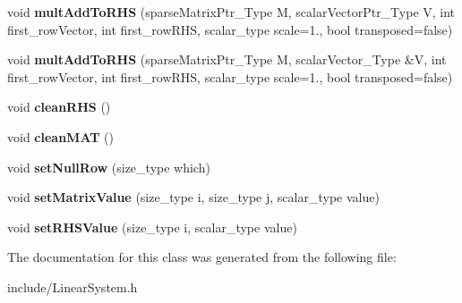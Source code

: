 \begin{DoxyCompactItemize}
\mbox{\label{classLinearSystem_aa2a59e6468778d3c655299065876f769}} 
void {\bfseries mult\+Add\+To\+R\+HS} (sparse\+Matrix\+Ptr\+\_\+\+Type M, scalar\+Vector\+Ptr\+\_\+\+Type V, int first\+\_\+row\+Vector, int first\+\_\+row\+R\+HS, scalar\+\_\+type scale=1., bool transposed=false)
\item 
\mbox{\label{classLinearSystem_a13451139fc04cc34d025fcb5b053ae01}} 
void {\bfseries mult\+Add\+To\+R\+HS} (sparse\+Matrix\+Ptr\+\_\+\+Type M, scalar\+Vector\+\_\+\+Type \&V, int first\+\_\+row\+Vector, int first\+\_\+row\+R\+HS, scalar\+\_\+type scale=1., bool transposed=false)
\item 
\mbox{\label{classLinearSystem_ad0577e81afa8dcc07db6806cb081192d}} 
void {\bfseries clean\+R\+HS} ()
\item 
\mbox{\label{classLinearSystem_a47007e77f2380ea08f0cb79377d06733}} 
void {\bfseries clean\+M\+AT} ()
\item 
\mbox{\label{classLinearSystem_ae72aaec2e50c88fc5fabf9de8b4890ca}} 
void {\bfseries set\+Null\+Row} (size\+\_\+type which)
\item 
\mbox{\label{classLinearSystem_a2397eabd867ff7912e373757956d6beb}} 
void {\bfseries set\+Matrix\+Value} (size\+\_\+type i, size\+\_\+type j, scalar\+\_\+type value)
\item 
\mbox{\label{classLinearSystem_ad3688699408a10cbd533af5b0560881a}} 
void {\bfseries set\+R\+H\+S\+Value} (size\+\_\+type i, scalar\+\_\+type value)
\end{DoxyCompactItemize}


The documentation for this class was generated from the following file\+:\begin{DoxyCompactItemize}
\item 
include/Linear\+System.\+h\end{DoxyCompactItemize}
